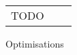 \begin{figure*}[t]
    \begin{tabular}{r c l}
    TODO
    \end{tabular}
    \caption{Optimisations}
    \label{fig:optim}    
\end{figure*}